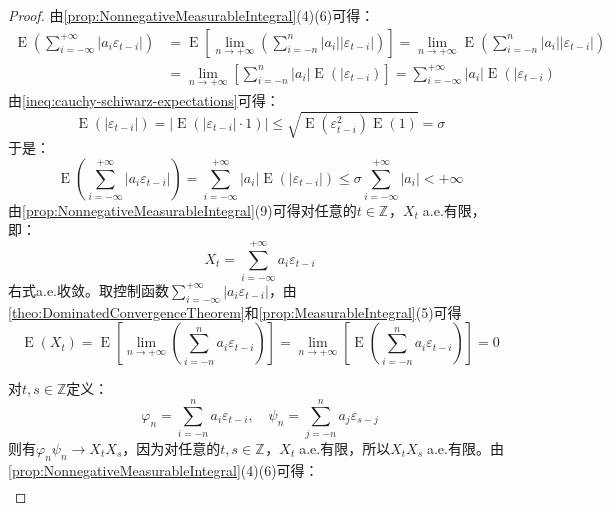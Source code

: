\begin{proof}
	由\cref{prop:NonnegativeMeasurableIntegral}(4)(6)可得：
	\begin{align*}
		\operatorname{E}\left(\sum_{i=-\infty}^{+\infty}|a_i\varepsilon_{t-i}|\right)&=\operatorname{E}\left[\lim_{n\to+\infty}\left(\sum_{i=-n}^{n}|a_i||\varepsilon_{t-i}|\right)\right]=\lim_{n\to+\infty}\operatorname{E}\left(\sum_{i=-n}^{n}|a_i||\varepsilon_{t-i}|\right) \\
		&=\lim_{n\to+\infty}\left[\sum_{i=-n}^{n}|a_i|\operatorname{E}(|\varepsilon_{t-i})\right]=\sum_{i=-\infty}^{+\infty}|a_i|\operatorname{E}(|\varepsilon_{t-i})
	\end{align*}
	由\cref{ineq:cauchy-schiwarz-expectations}可得：
	\begin{equation*}
		\operatorname{E}(|\varepsilon_{t-i}|)=\Big|\operatorname{E}(|\varepsilon_{t-i}|\cdot1)\Big|\leqslant\sqrt{\operatorname{E}(\varepsilon_{t-i}^2)\operatorname{E}(1)}=\sigma
	\end{equation*}
	于是：
	\begin{equation*}
		\operatorname{E}\left(\sum_{i=-\infty}^{+\infty}|a_i\varepsilon_{t-i}|\right)=\sum_{i=-\infty}^{+\infty}|a_i|\operatorname{E}(|\varepsilon_{t-i}|)\leqslant\sigma\sum_{i=-\infty}^{+\infty}|a_i|<+\infty
	\end{equation*}
	由\cref{prop:NonnegativeMeasurableIntegral}(9)可得对任意的$t\in\mathbb{Z}^{}$，$X_t\;$a.e.有限，即：
	\begin{equation*}
		X_t=\sum_{i=-\infty}^{+\infty}a_i\varepsilon_{t-i}
	\end{equation*}
	右式a.e.收敛。取控制函数$\sum\limits_{i=-\infty}^{+\infty}|a_i\varepsilon_{t-i}|$，由\cref{theo:DominatedConvergenceTheorem}和\cref{prop:MeasurableIntegral}(5)可得
	\begin{equation*}
		\operatorname{E}(X_t)=\operatorname{E}\left[\lim_{n\to+\infty}\left(\sum_{i=-n}^{n}a_i\varepsilon_{t-i}\right)\right]=\lim_{n\to+\infty}\left[\operatorname{E}\left(\sum_{i=-n}^{n}a_i\varepsilon_{t-i}\right)\right]=0
	\end{equation*}\par
	对$t,s\in\mathbb{Z}$定义：
	\begin{equation*}
		\varphi_n=\sum_{i=-n}^{n}a_i\varepsilon_{t-i},\quad\psi_n=\sum_{j=-n}^{n}a_j\varepsilon_{s-j}
	\end{equation*}
	则有$\varphi_n\psi_n\to X_tX_s$，因为对任意的$t,s\in\mathbb{Z}^{}$，$X_t\;$a.e.有限，所以$X_tX_s\;$a.e.有限。由\cref{prop:NonnegativeMeasurableIntegral}(4)(6)可得：
	\begin{align*}

\end{align*}
\end{proof}
